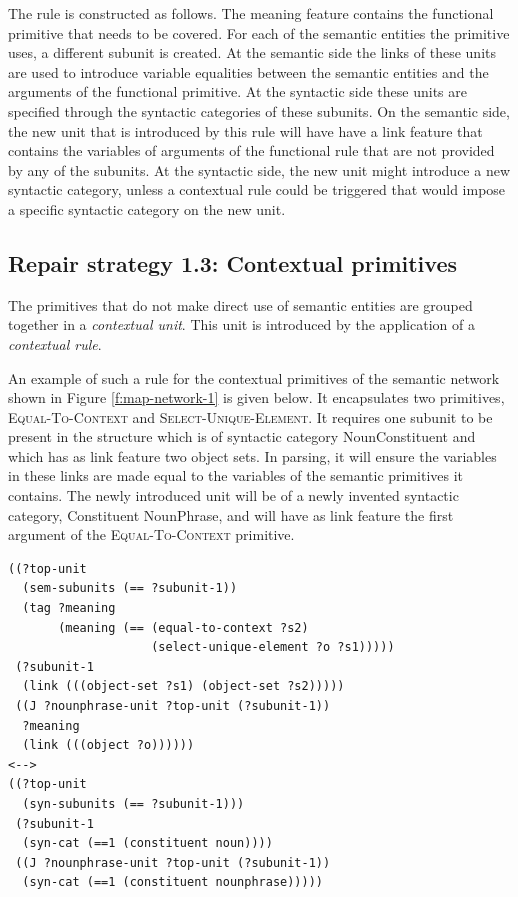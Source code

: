 The rule is constructed as follows. The meaning feature contains the
functional primitive that needs to be covered. For each of the
semantic entities the primitive uses, a different subunit is
created. At the semantic side the links of these units are used to
introduce variable equalities between the semantic entities and the
arguments of the functional primitive. At the syntactic side these
units are specified through the syntactic categories of these
subunits.  On the semantic side, the new unit that is introduced by
this rule will have have a link feature that contains the variables of
arguments of the functional rule that are not provided by any of the
subunits. At the syntactic side, the new unit might introduce a new
syntactic category, unless a contextual rule could be triggered that
would impose a specific syntactic category on the new unit.

\subsection{Repair strategy 1.3: Contextual primitives}

The primitives that do not make direct use of semantic entities are
grouped together in a \emph{contextual unit}. This unit is introduced
by the application of a \emph{contextual rule}. 

An example of such a rule for the contextual primitives of the
semantic network shown in Figure \ref{f:map-network-1} is given
below. It encapsulates two primitives, \textsc{Equal-To-Context} and
\textsc{Select-Unique-Element}. It requires one subunit to be present
in the structure which is of syntactic category NounConstituent and
which has as link feature two object sets. In parsing, it will ensure
the variables in these links are made equal to the variables of the
semantic primitives it contains. The newly introduced unit will be of
a newly invented syntactic category, Constituent NounPhrase, and will
have as link feature the first argument of the
\textsc{Equal-To-Context} primitive.

\footnotesize
{}
\begin{lstlisting}
((?top-unit
  (sem-subunits (== ?subunit-1))
  (tag ?meaning
       (meaning (== (equal-to-context ?s2) 
                    (select-unique-element ?o ?s1)))))
 (?subunit-1 
  (link (((object-set ?s1) (object-set ?s2)))))
 ((J ?nounphrase-unit ?top-unit (?subunit-1))
  ?meaning
  (link (((object ?o))))))
<-->
((?top-unit 
  (syn-subunits (== ?subunit-1)))
 (?subunit-1 
  (syn-cat (==1 (constituent noun))))
 ((J ?nounphrase-unit ?top-unit (?subunit-1))
  (syn-cat (==1 (constituent nounphrase)))))
\end{lstlisting}
\normalsize


